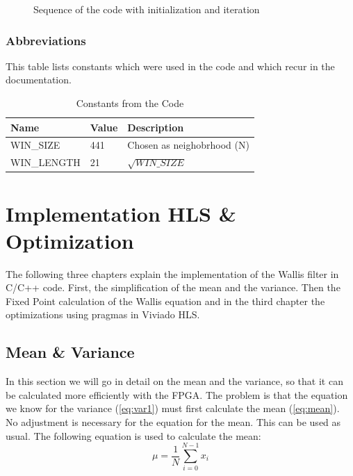 \begin{figure}[tb!]
    \centering
    \begin{adjustbox}{max width=\textwidth}
        
    \end{adjustbox}
    \caption{Sequence of the code with initialization and iteration}
    \label{fig:sequence}
\end{figure}

\subsubsection*{Abbreviations}
This table lists constants which were used in the code and which recur in the documentation.

\begin{table}[tb!]
    \centering
    \begin{tabular}{l l l}
        \toprule
        Name & Value & Description  \\
        \midrule
        WIN\_SIZE & 441 & Chosen as neighobrhood (N)
        \\
        WIN\_LENGTH & 21 & $\sqrt{WIN\_SIZE}$ 
        \\
        \bottomrule
    \end{tabular}
    \caption{Constants from the Code}
    \label{tab:c_div}
\end{table}


\section{Implementation HLS \& Optimization} \label{ch:ip:hls_opt}
The following three chapters explain the implementation of the Wallis filter in C/C++ code. First, the simplification of the mean and the variance. Then the Fixed Point calculation of the Wallis equation and in the third chapter the optimizations using pragmas in Viviado HLS.

\subsection{Mean \& Variance} \label{ch:ip:mean_var}
In this section we will go in detail on the mean and the variance, so that it can be calculated more efficiently with the FPGA. The problem is that the equation we know for the variance (\ref{eq:var1}) must first calculate the mean (\ref{eq:mean}). \\
No adjustment is necessary for the equation for the mean. This can be used as usual. The following equation	is used to calculate the mean:
\begin{equation}
    \mu = \frac{1}{N} \sum_{i = 0}^{N - 1} x_{i}
    \label{eq:mean}
\end{equation} 

